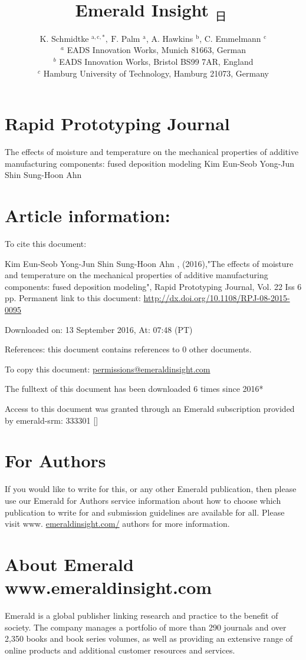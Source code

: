 \documentclass[10pt]{article}
\title{Emerald Insight ${ }_{\text {日 }}$ }
\author{K. Schmidtke ${ }^{\mathrm{a}, \mathrm{c}, *}, \mathrm{~F}$. Palm $^{\mathrm{a}}$, A. Hawkins ${ }^{\mathrm{b}}$, C. Emmelmann ${ }^{\mathrm{c}}$\\
${ }^{a}$ EADS Innovation Works, Munich 81663, German\\
${ }^{b}$ EADS Innovation Works, Bristol BS99 7AR, England\\
${ }^{c}$ Hamburg University of Technology, Hamburg 21073, Germany}
\date{}
\begin{document}
\maketitle
\section*{Rapid Prototyping Journal}
The effects of moisture and temperature on the mechanical properties of additive manufacturing components: fused deposition modeling Kim Eun-Seob Yong-Jun Shin Sung-Hoon Ahn

\section*{Article information:}
To cite this document:

Kim Eun-Seob Yong-Jun Shin Sung-Hoon Ahn , (2016),"The effects of moisture and temperature on the mechanical properties of additive manufacturing components: fused deposition modeling", Rapid Prototyping Journal, Vol. 22 Iss 6 pp. Permanent link to this document: \href{http://dx.doi.org/10.1108/RPJ-08-2015-0095}{http://dx.doi.org/10.1108/RPJ-08-2015-0095}

Downloaded on: 13 September 2016, At: 07:48 (PT)

References: this document contains references to 0 other documents.

To copy this document: \href{mailto:permissions@emeraldinsight.com}{permissions@emeraldinsight.com}

The fulltext of this document has been downloaded 6 times since 2016*

Access to this document was granted through an Emerald subscription provided by emerald-srm: 333301 []

\section*{For Authors}
If you would like to write for this, or any other Emerald publication, then please use our Emerald for Authors service information about how to choose which publication to write for and submission guidelines are available for all. Please visit www. \href{http://emeraldinsight.com/}{emeraldinsight.com/} authors for more information.

\section*{About Emerald www.emeraldinsight.com}
Emerald is a global publisher linking research and practice to the benefit of society. The company manages a portfolio of more than 290 journals and over 2,350 books and book series volumes, as well as providing an extensive range of online products and additional customer resources and services.
\end{document}
